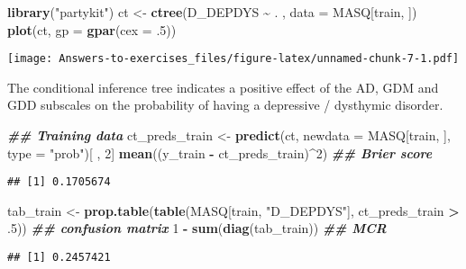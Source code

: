 \documentclass[
]{article}
\newenvironment{Shaded}{\begin{snugshade}}{\end{snugshade}}
\newcommand{\AttributeTok}[1]{\textcolor[rgb]{0.13,0.29,0.53}{#1}}
\newcommand{\DecValTok}[1]{\textcolor[rgb]{0.00,0.00,0.81}{#1}}
\newcommand{\DocumentationTok}[1]{\textcolor[rgb]{0.56,0.35,0.01}{\textbf{\textit{#1}}}}
\newcommand{\FunctionTok}[1]{\textcolor[rgb]{0.13,0.29,0.53}{\textbf{#1}}}
\newcommand{\NormalTok}[1]{#1}
\newcommand{\OtherTok}[1]{\textcolor[rgb]{0.56,0.35,0.01}{#1}}
\newcommand{\SpecialCharTok}[1]{\textcolor[rgb]{0.81,0.36,0.00}{\textbf{#1}}}
\newcommand{\StringTok}[1]{\textcolor[rgb]{0.31,0.60,0.02}{#1}}
\begin{document}
\begin{Shaded}
\begin{Highlighting}[]
\FunctionTok{library}\NormalTok{(}\StringTok{"partykit"}\NormalTok{)}
\NormalTok{ct }\OtherTok{\textless{}{-}} \FunctionTok{ctree}\NormalTok{(D\_DEPDYS }\SpecialCharTok{\textasciitilde{}}\NormalTok{ . , }\AttributeTok{data =}\NormalTok{ MASQ[train, ])}
\FunctionTok{plot}\NormalTok{(ct, }\AttributeTok{gp =} \FunctionTok{gpar}\NormalTok{(}\AttributeTok{cex =}\NormalTok{ .}\DecValTok{5}\NormalTok{))}
\end{Highlighting}
\end{Shaded}

\texttt{[image: Answers-to-exercises\_files/figure-latex/unnamed-chunk-7-1.pdf]}

The conditional inference tree indicates a positive effect of the AD,
GDM and GDD subscales on the probability of having a depressive /
dysthymic disorder.

\begin{Shaded}
\begin{Highlighting}[]
\DocumentationTok{\#\# Training data}
\NormalTok{ct\_preds\_train }\OtherTok{\textless{}{-}} \FunctionTok{predict}\NormalTok{(ct, }\AttributeTok{newdata =}\NormalTok{ MASQ[train, ], }\AttributeTok{type =} \StringTok{"prob"}\NormalTok{)[ , }\DecValTok{2}\NormalTok{]}
\FunctionTok{mean}\NormalTok{((y\_train }\SpecialCharTok{{-}}\NormalTok{ ct\_preds\_train)}\SpecialCharTok{\^{}}\DecValTok{2}\NormalTok{) }\DocumentationTok{\#\# Brier score}
\end{Highlighting}
\end{Shaded}

\begin{verbatim}
## [1] 0.1705674
\end{verbatim}

\begin{Shaded}
\begin{Highlighting}[]
\NormalTok{tab\_train }\OtherTok{\textless{}{-}} \FunctionTok{prop.table}\NormalTok{(}\FunctionTok{table}\NormalTok{(MASQ[train, }\StringTok{"D\_DEPDYS"}\NormalTok{], ct\_preds\_train }\SpecialCharTok{\textgreater{}}\NormalTok{ .}\DecValTok{5}\NormalTok{)) }\DocumentationTok{\#\# confusion matrix}
\DecValTok{1} \SpecialCharTok{{-}} \FunctionTok{sum}\NormalTok{(}\FunctionTok{diag}\NormalTok{(tab\_train)) }\DocumentationTok{\#\# MCR}
\end{Highlighting}
\end{Shaded}

\begin{verbatim}
## [1] 0.2457421
\end{verbatim}
\end{document}
